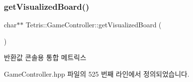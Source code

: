 \subsubsection{\texorpdfstring{get\+Visualized\+Board()}{getVisualizedBoard()}\hspace{0.1cm}{\footnotesize\ttfamily [2/2]}}
{\footnotesize\ttfamily char$\ast$$\ast$ Tetris\+::\+Game\+Controller\+::get\+Visualized\+Board (\begin{DoxyParamCaption}{ }\end{DoxyParamCaption})\hspace{0.3cm}{\ttfamily [inline]}}

\begin{DoxyReturn}{반환값}
콘솔용 통합 메트릭스 
\end{DoxyReturn}


Game\+Controller.\+hpp 파일의 525 번째 라인에서 정의되었습니다.


